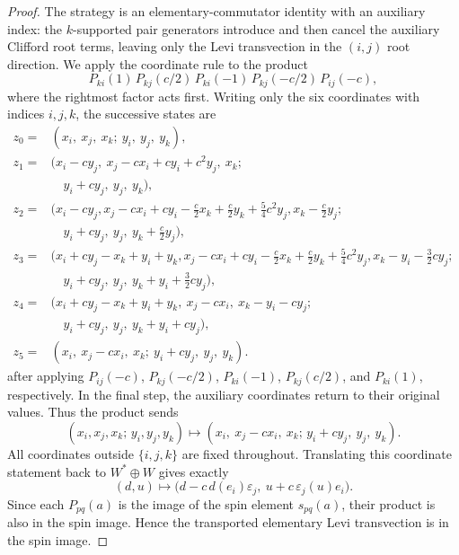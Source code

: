\documentclass[10pt,a4paper]{amsart}
\begin{document}
\begin{proof}
The strategy is an elementary-commutator identity with an auxiliary index:
the \(k\)-supported pair generators introduce and then cancel the
auxiliary Clifford root terms, leaving only the
Levi transvection in the \((i,j)\) root direction. We apply the coordinate rule to
the product
\[
  P_{ki}(1)\,P_{kj}(c/2)\,P_{ki}(-1)\,P_{kj}(-c/2)\,P_{ij}(-c),
\]
where the rightmost factor acts first. Writing only the six coordinates with
indices \(i,j,k\), the successive states are
\begingroup
\small
\[
\begin{aligned}
z_0={}&(x_i,\ x_j,\ x_k;\ y_i,\ y_j,\ y_k),\\
z_1={}&(x_i-cy_j,\ x_j-cx_i+cy_i+c^2y_j,\ x_k;\\
&\quad y_i+cy_j,\ y_j,\ y_k),\\
z_2={}&(x_i-cy_j,
  x_j-cx_i+cy_i-\tfrac c2x_k+\tfrac c2y_k+\tfrac54c^2y_j,
  x_k-\tfrac c2y_j;\\
&\quad y_i+cy_j,\ y_j,\ y_k+\tfrac c2y_j),\\
z_3={}&(x_i+cy_j-x_k+y_i+y_k,
  x_j-cx_i+cy_i-\tfrac c2x_k+\tfrac c2y_k+\tfrac54c^2y_j,
  x_k-y_i-\tfrac32cy_j;\\
&\quad y_i+cy_j,\ y_j,\ y_k+y_i+\tfrac32cy_j),\\
z_4={}&(x_i+cy_j-x_k+y_i+y_k,\ x_j-cx_i,\ x_k-y_i-cy_j;\\
&\quad y_i+cy_j,\ y_j,\ y_k+y_i+cy_j),\\
z_5={}&(x_i,\ x_j-cx_i,\ x_k;\ y_i+cy_j,\ y_j,\ y_k).
\end{aligned}
\]
\endgroup
after applying \(P_{ij}(-c)\), \(P_{kj}(-c/2)\), \(P_{ki}(-1)\),
\(P_{kj}(c/2)\), and \(P_{ki}(1)\), respectively. In the final step, the
auxiliary coordinates return to their original values.
Thus the product sends
\[
 (x_i,x_j,x_k;\,y_i,y_j,y_k)
 \longmapsto
 (x_i,\ x_j-cx_i,\ x_k;\, y_i+cy_j,\ y_j,\ y_k).
\]
All coordinates outside \(\{i,j,k\}\) are fixed throughout. Translating this
coordinate statement back to \(W^*\oplus W\) gives exactly
\[
  (d,u)\longmapsto
  \bigl(d-c\,d(e_i)\varepsilon_j,\ u+c\,\varepsilon_j(u)e_i\bigr).
\]
Since each \(P_{pq}(a)\) is the image of the spin element \(s_{pq}(a)\), their
product is also in the spin image. Hence the transported elementary Levi
transvection is in the spin image.
\end{proof}
\end{document}

